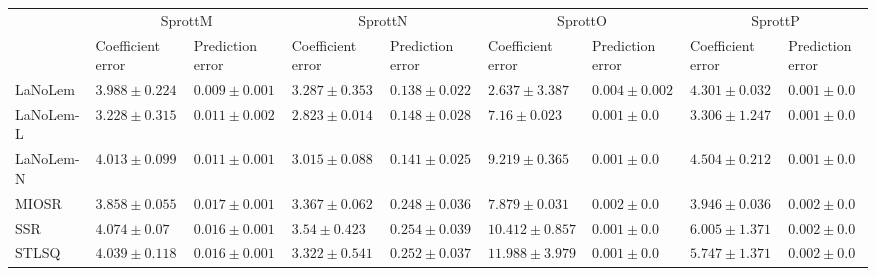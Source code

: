 \begin{table*}
{\begin{tabular}{lllllllll}
 & \multicolumn{2}{c}{SprottM} & \multicolumn{2}{c}{SprottN} & \multicolumn{2}{c}{SprottO} & \multicolumn{2}{c}{SprottP} \\
 & Coefficient error & Prediction error & Coefficient error & Prediction error & Coefficient error & Prediction error & Coefficient error & Prediction error \\
\midrule
LaNoLem & $3.988\pm 0.224$ & $\mathbf{0.009}\pm 0.001$ & $3.287\pm 0.353$ & $\mathbf{0.138}\pm 0.022$ & $\mathbf{2.637}\pm 3.387$ & $0.004\pm 0.002$ & $4.301\pm 0.032$ & $0.001\pm 0.0$ \\
LaNoLem-L & $\mathbf{3.228}\pm 0.315$ & $0.011\pm 0.002$ & $\mathbf{2.823}\pm 0.014$ & $0.148\pm 0.028$ & $7.16\pm 0.023$ & $0.001\pm 0.0$ & $\mathbf{3.306}\pm 1.247$ & $0.001\pm 0.0$ \\
LaNoLem-N & $4.013\pm 0.099$ & $0.011\pm 0.001$ & $3.015\pm 0.088$ & $0.141\pm 0.025$ & $9.219\pm 0.365$ & $\mathbf{0.001}\pm 0.0$ & $4.504\pm 0.212$ & $\mathbf{0.001}\pm 0.0$ \\
MIOSR & $3.858\pm 0.055$ & $0.017\pm 0.001$ & $3.367\pm 0.062$ & $0.248\pm 0.036$ & $7.879\pm 0.031$ & $0.002\pm 0.0$ & $3.946\pm 0.036$ & $0.002\pm 0.0$ \\
SSR & $4.074\pm 0.07$ & $0.016\pm 0.001$ & $3.54\pm 0.423$ & $0.254\pm 0.039$ & $10.412\pm 0.857$ & $0.001\pm 0.0$ & $6.005\pm 1.371$ & $0.002\pm 0.0$ \\
STLSQ & $4.039\pm 0.118$ & $0.016\pm 0.001$ & $3.322\pm 0.541$ & $0.252\pm 0.037$ & $11.988\pm 3.979$ & $0.001\pm 0.0$ & $5.747\pm 1.371$ & $0.002\pm 0.0$ \\

\midrule


\end{tabular}}
\end{table*}
